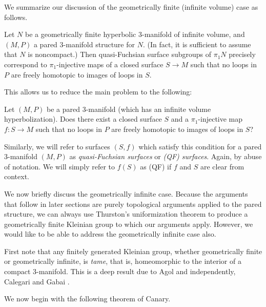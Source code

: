 We summarize our discussion of the geometrically finite (infinite volume) case
as follows.

\begin{prop}

Let $N$ be a geometrically finite hyperbolic $3$-manifold of infinite volume,
and $(M,P)$ a pared $3$-manifold structure for $N$. (In fact, it is sufficient
to assume that $N$ is noncompact.) Then quasi-Fuchsian surface subgroups of
$\pi_1N$ precisely correspond to $\pi_1$-injective maps of a closed surface $S
\to M$ such that no loops in $P$ are freely homotopic to images of loops in
$S$.

\end{prop}

This allows us to reduce the main problem to the following:

\begin{prob}

Let $(M,P)$ be a pared $3$-manifold (which has an infinite volume
hyperbolization).  Does there exist a closed surface $S$ and
a $\pi_1$-injective map $f \colon S \to M$ such that no loops in $P$ are freely
homotopic to images of loops in $S$?

\end{prob}

Similarly, we will refer to surfaces $(S,f)$ which satisfy this condition for
a pared $3$-manifold $(M,P)$ as \emph{quasi-Fuchsian surfaces} or \emph{(QF)
surfaces}.  Again, by abuse of notation. We will simply refer to $f(S)$ as (QF)
if $f$ and $S$ are clear from context.

We now briefly discuss the geometrically infinite case. Because the arguments
that follow in later sections are purely topological arguments applied to the
pared structure, we can always use Thurston's uniformization theorem to produce
a geometrically finite Kleinian group to which our arguments apply. However, we
would like to be able to address the geometrically infinite case also.

First note that any finitely generated Kleinian group, whether geometrically
finite or geometrically infinite, is \emph{tame}, that is, homeomorphic to the
interior of a compact $3$-manifold. This is a deep result due to Agol
\cite{Agoltameness} and independently, Calegari and Gabai \cite{CalegariGabai}.

We now begin with the following theorem of Canary.

